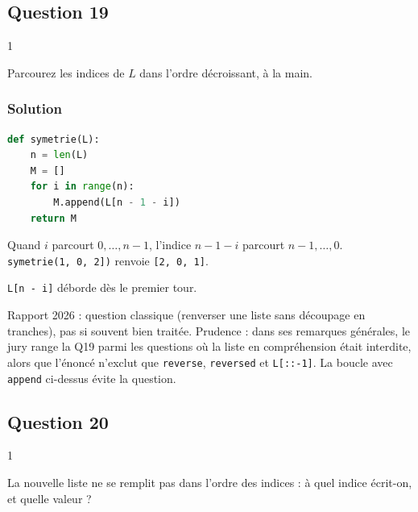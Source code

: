 \documentclass[11pt,a4paper]{article}
\begin{document}
\hypertarget{question-19}{%
\subsection{Question 19}\label{question-19}}

\begin{indication}{1}

Parcourez les indices de \(L\) dans l'ordre décroissant, à la main.

\end{indication}

\hypertarget{solution-18}{%
\subsubsection{Solution}\label{solution-18}}

\begin{lstlisting}[language=Python]
def symetrie(L):
    n = len(L)
    M = []
    for i in range(n):
        M.append(L[n - 1 - i])
    return M
\end{lstlisting}

Quand \(i\) parcourt \(0, \dots, n-1\), l'indice \(n - 1 - i\) parcourt \(n - 1, \dots, 0\). \texttt{symetrie(\allowbreak{}{[}1,\allowbreak{}\ 0,\allowbreak{}\ 2{]}\allowbreak{})\allowbreak{}} renvoie \texttt{{[}2,\ 0,\ 1{]}}.

\begin{piege}

\texttt{L{[}n\ -\ i{]}} déborde dès le premier tour.

\end{piege}

\begin{jury}

Rapport 2026 : question classique (renverser une liste sans découpage en tranches), pas si souvent bien traitée. Prudence : dans ses remarques générales, le jury range la Q19 parmi les questions où la liste en compréhension était interdite, alors que l'énoncé n'exclut que \texttt{reverse}, \texttt{reversed} et \texttt{L{[}::-1{]}}. La boucle avec \texttt{append} ci-dessus évite la question.

\end{jury}

\hypertarget{question-20}{%
\subsection{Question 20}\label{question-20}}

\begin{indication}{1}

La nouvelle liste ne se remplit pas dans l'ordre des indices : à quel indice écrit-on, et quelle valeur ?

\end{indication}
\end{document}
